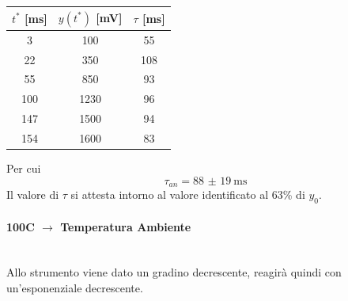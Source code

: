 \documentclass[a4paper, 12pt, twoside]{report}
\newcommand{\ra}[1]{\renewcommand{\arraystretch}{#1}} %
\begin{document}
		\begin{table}[H]
			\centering
			\ra{1.3}
			\begin{tabular}{ccc}
				\toprule
				$t^*$ [\si{\milli\second}] & $y(t^*)$ [\si{\milli\volt}] & $\tau$ [\si{\milli\second}] \\ \midrule
				3                                                     & 100                                                       & 55                                                      \\
				22                                                     & 350                                                       & 108                                                      \\
				55                                                     & 850                                                       & 93                                                      \\
				100                                                     & 1230                                                        & 96                                                      \\
				147                                                     & 1500                                                        & 94                                                      \\
				154                                                     & 1600                                                        & 83                                                      \\ \bottomrule
			\end{tabular}
		\end{table}
		Per cui
		\[\tau_{an} = \SI[separate-uncertainty = true]{88(19)}{\milli\second}\]				
		Il valore di $\tau$ si attesta intorno al valore identificato al 63\% di $y_0$.
\newpage
		\paragraph{100\degree C $\rightarrow$ Temperatura Ambiente}	\mbox{}\\
		Allo strumento viene dato un gradino decrescente, reagirà quindi con un'esponenziale decrescente. \newline
		
\end{document}
